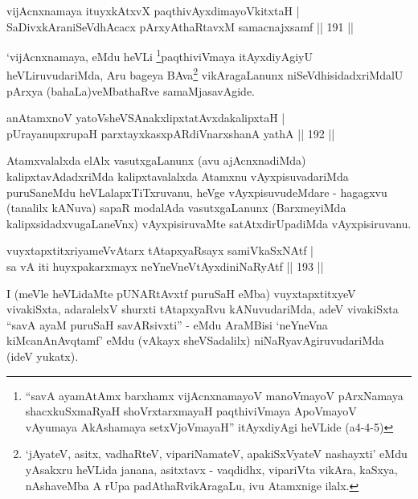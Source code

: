 \begin{shl}
vijAcnxnamaya ituyxkAtxvX paqthivAyxdimayoVkitxtaH |\\
SaDivxkAraniSeVdhAcacx pArxyAthaRtavxM samacnajxsamf \hfill || 191 ||
\end{shl}

\begin{artha}
`vijAcnxnamaya, eMdu heVLi \footnote{``savA ayamAtAmx barxhamx vijAcnxnamayoV manoVmayoV pArxNamaya shacxkuSxmaRyaH shoVrxtarxmayaH paqthiviVmaya ApoVmayoV vAyumaya AkAshamaya setxVjoVmayaH'' itAyxdiyAgi heVLide (a4-4-5)}paqthiviVmaya itAyxdiyAgiyU heVLiruvuda\-riMda, Aru bageya BAva\footnote{`jAyateV, asitx, vadhaRteV, vipariNamateV, apakiSxVyateV nashayxti' eMdu yAsakxru heVLida janana, asitxtavx - vaqdidhx, vipariVta vikAra, kaSxya, nAshaveMba A rUpa padAthaRvikAragaLu, ivu Atamxnige ilalx.} vikAragaLanunx niSeVdhisidadxriMdalU pArxya (bahaLa)\-veMbathaRve samaMjasavAgide.
\end{artha}


\begin{shl}
anAtamxnoV yatoV\s sheVSAnakxlipxtatAvxdakalipxtaH |\\
pUrayanupxrupaH parxtayxkasxpARdiVnarxshanA yathA \hfill || 192 ||
\end{shl}

\begin{artha}
Atamxvalalxda elAlx vasutxgaLanunx (avu ajAcnxnadiMda) kalipxtavAdadxriMda kalipxtavalalxda Atamxnu vAyxpisuvadariMda puruSaneMdu heVLalapxTiTxruvanu, heVge \-vAyxpisuvudeMdare - hagagxvu (tanalilx kANuva) sapaR modalAda vasutxgaLanunx (BarxmeyiMda kalipxsidadxvu\-gaLaneVnx) vAyxpisiruvaMte satAtxdirUpadiMda vAyxpisiruvanu.
\end{artha}



\begin{shl}
vuyxtapxtitxriyameVvAtarx tAtapxyaRsayx samiVkaSxNAtf |\\
sa vA iti huyxpakarxmayx neYneVneVtAyxdiniNaRyAtf \hfill || 193 ||
\end{shl}

\begin{artha}
I (meVle heVLidaMte pUNARtAvxtf puruSaH eMba) vuyxtapxtitxyeV vivakiSxta, adaralelxV shurxti tAtapxyaRvu kANuvudariMda, adeV vivakiSxta ``savA ayaM puruSaH savARsivxti'' - eMdu AraMBisi `neYneVna kiMcanAnAvqtamf' eMdu (vAkayx sheVSadalilx) niNaRyavAgiruvudariMda (ideV yukatx).
\end{artha}

